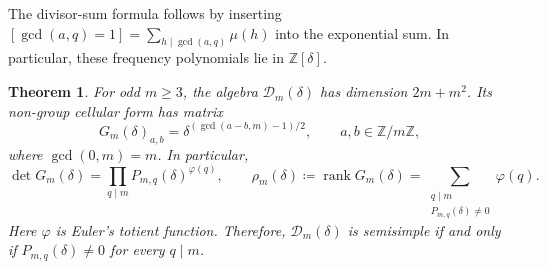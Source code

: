 \documentclass[11pt,a4paper]{amsart}
\newtheorem{theorem}{Theorem}[section]
\theoremstyle{uprightdefinition}
\theoremstyle{remark}\newtheorem{remark}[theorem]{Remark}
\begin{document}
The divisor-sum formula follows by inserting
$[\gcd(a,q)=1]=\sum_{h\mid\gcd(a,q)}\mu(h)$ into the exponential
sum. In particular, these frequency polynomials lie in $\mathbb Z[\delta]$.

\begin{theorem}\label{thm:odd-dihedral-spectrum}
For odd $m\geq3$, the algebra $\mathcal D_m(\delta)$ has dimension $2m+m^2$.
Its non-group cellular form has matrix
\begin{equation}\label{eq:dihedral-gcd-gram}
 G_m(\delta)_{a,b}
       =\delta^{(\gcd(a-b,m)-1)/2},
       \qquad a,b\in\mathbb Z/m\mathbb Z,
\end{equation}
where $\gcd(0,m)=m$. In particular,
\begin{equation}\label{eq:dihedral-det}
 \det G_m(\delta)=\prod_{q\mid m}P_{m,q}(\delta)^{\varphi(q)},
 \qquad
 \rho_m(\delta)\coloneqq\operatorname{rank}G_m(\delta)
   =\sum_{\substack{q\mid m\\P_{m,q}(\delta)\ne0}}\varphi(q).
\end{equation}
Here $\varphi$ is Euler's totient function. Therefore,
$\mathcal D_m(\delta)$ is semisimple if and only if $P_{m,q}(\delta)\ne0$ for every $q\mid m$.

\end{theorem}
\end{document}
